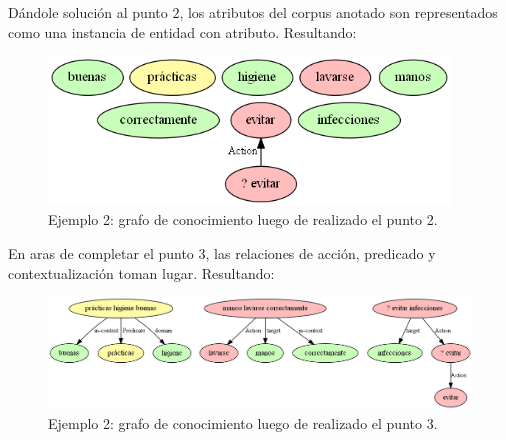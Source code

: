 \vspace{-0.2in}
Dándole solución al punto $2$, los atributos del corpus anotado son representados como una instancia de entidad con atributo. Resultando:
\begin{figure}[H]
	\begin{center}
		\includegraphics[width=4.2in]{graphics/knowledge_graph_example2_2.png}
		\caption[Ejemplo 2: grafo de conocimiento luego de realizado el punto 2]{Ejemplo 2: grafo de conocimiento luego de realizado el punto 2.}
		\label{fig:knowledge_graph2.2}
	\end{center}
\end{figure}

\vspace{-0.2in}
En aras de completar el punto $3$, las relaciones de acción, predicado y contextualización toman lugar. Resultando:
\begin{figure}[H]
	\begin{center}
		\includegraphics[width=\textwidth]{graphics/knowledge_graph_example2_3.png}
		\caption[Ejemplo 2: grafo de conocimiento luego de realizado el punto 3]{Ejemplo 2: grafo de conocimiento luego de realizado el punto 3.}
		\label{fig:knowledge_graph2.3}
	\end{center}
\end{figure}

